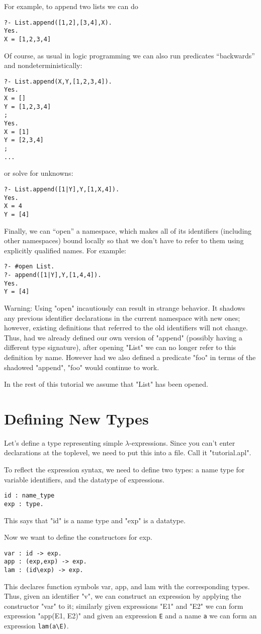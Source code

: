 \documentclass[draft,12pt]{report}
\begin{document}
For example, to append two lists we can do
\begin{verbatim}
?- List.append([1,2],[3,4],X).
Yes. 
X = [1,2,3,4]
\end{verbatim}
Of course, as usual in logic programming we can also run predicates
``backwards'' and nondeterministically:
\begin{verbatim}
?- List.append(X,Y,[1,2,3,4]).
Yes.
X = [] 
Y = [1,2,3,4] 
;
Yes.
X = [1] 
Y = [2,3,4] 
;
...
\end{verbatim}
or solve for unknowns:
\begin{verbatim}
?- List.append([1|Y],Y,[1,X,4]).
Yes.
X = 4 
Y = [4] 
\end{verbatim}

Finally, we can ``open'' a namespace, which makes all of its
identifiers (including other namespaces) bound locally so that we
don't have to refer to them using explicitly qualified names.  For
example:
\begin{verbatim}
?- #open List.
?- append([1|Y],Y,[1,4,4]).
Yes.
Y = [4] 
\end{verbatim}
Warning: Using "open" incautiously can result in strange behavior.  It
shadows any previous identifier declarations in the current namespace
with new ones; however, existing definitions that referred to the old
identifiers will not change.  Thus, had we already defined our own
version of "append" (possibly having a different type signature),
after opening "List" we can no longer refer to this definition by
name.  However had we also defined a predicate "foo" in terms of the
shadowed "append", "foo" would continue to work.

In the rest of this tutorial we assume that "List" has been opened.
\section{Defining New Types}

Let's define a type representing simple $\lambda$-expressions.  Since
you can't enter declarations at the toplevel, we need to put this into
a file.  Call it "tutorial.apl".

To reflect the expression syntax, we need to define two types: a name
type for variable identifiers, and the datatype of expressions.
\begin{verbatim}
id : name_type
exp : type.
\end{verbatim}
This says that "id" is a name type and "exp" is a datatype.

Now we want to define the constructors for exp.
\begin{verbatim}
var : id -> exp.
app : (exp,exp) -> exp.
lam : (id\exp) -> exp.
\end{verbatim}
This declares function symbols var, app, and lam with the
corresponding types.  Thus, given an identifier "v", we can construct
an expression by applying the constructor "var" to it; similarly given
expressions "E1" and "E2" we can form expression "app(E1, E2)" and
given an expression \verb|E| and a name \verb|a| we can form an
expression \verb|lam(a\E)|.
\end{document}
